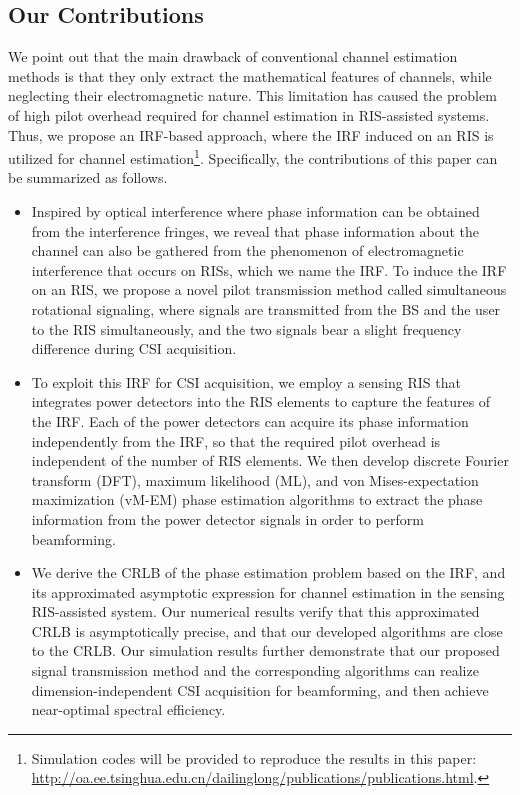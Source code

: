 \documentclass[journal,twocolumn]{IEEEtran}
\theoremstyle{nonumberplain}
\begin{document}
\subsection{Our Contributions}
\label{Our Contributions}

We point out that the main drawback of conventional channel estimation methods is that they only extract the mathematical features of channels, while neglecting their electromagnetic nature. This limitation has caused the problem of high pilot overhead required for channel estimation in RIS-assisted systems. Thus, we propose an \ac{IRF}-based approach, where the \ac{IRF} induced on an RIS is utilized for channel estimation\footnote{Simulation codes will be provided to reproduce the results in this paper: \url{http://oa.ee.tsinghua.edu.cn/dailinglong/publications/publications.html}.}.
Specifically, the contributions of this paper can be summarized as follows.
    \begin{itemize}
        \item %
        Inspired by optical interference where phase information can be obtained from the interference fringes, we reveal that phase information about the channel can also be gathered from the phenomenon of electromagnetic interference that occurs on RISs, which we name the \ac{IRF}. %
        To induce the \ac{IRF} on an RIS, we propose a novel pilot transmission method called simultaneous rotational signaling, where signals are transmitted from the \ac{BS} and the user to the RIS simultaneously, and the two signals bear a slight frequency difference during CSI acquisition. 
        \item
        To exploit this \ac{IRF} for CSI acquisition, we employ a  sensing RIS that integrates power detectors into the RIS elements to capture the features of the \ac{IRF}. Each of the power detectors can acquire its phase information independently from the \ac{IRF}, so that the required pilot overhead is independent of the number of RIS elements. 
        We then develop discrete Fourier transform (DFT), maximum likelihood (ML), and von Mises-expectation maximization (vM-EM) phase estimation algorithms to extract the phase information from the power detector signals in order to perform beamforming. 
        \item
        We derive the \ac{CRLB} of the phase estimation problem based on the \ac{IRF}, and its approximated asymptotic expression for channel estimation in the sensing RIS-assisted system.
        Our numerical results verify that this approximated \ac{CRLB} is asymptotically precise, and that our developed algorithms are close to the \ac{CRLB}. 
        Our simulation results further demonstrate that our proposed signal transmission method and the corresponding algorithms can realize dimension-independent CSI acquisition for beamforming, and then achieve near-optimal spectral efficiency. 
    \end{itemize}
\end{document}
